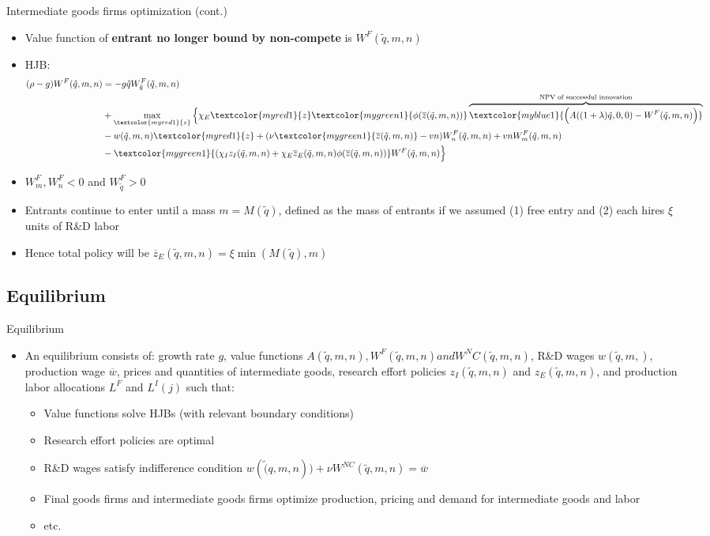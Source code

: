 \documentclass[english,usenames,dvipsnames]{beamer}
\begin{document}
\begin{frame}{Intermediate goods firms optimization (cont.)}
\begin{itemize}
	\small
	\item Value function of \textbf{entrant no longer bound by non-compete} is $W^{F}(\tilde{q},m,n)$
	\item HJB:
	\footnotesize
	\begin{align*}
	(\rho - g)W^F(\tilde{q},m,n) &= - g\tilde{q}W^F_{\tilde{q}}(\tilde{q},m,n) \\
	& + \max_{\textcolor{myred1}{z}} \Big\{\chi_E\textcolor{myred1}{z}\textcolor{mygreen1}{\phi(\overline{z}(\tilde{q},m,n))}\overbrace{\textcolor{myblue1}{\Big(A((1+\lambda)\tilde{q},0,0)-W^F(\tilde{q},m,n)\Big)}}^{\text{NPV of successful innovation}} \\
	& - w(\tilde{q},m,n)\textcolor{myred1}{z} +(\nu \textcolor{mygreen1}{\overline{z}(\tilde{q},m,n)}-vn)W^F_n(\tilde{q},m,n)+vnW^F_m(\tilde{q},m,n) \\
	& - \textcolor{mygreen1}{(\chi_Iz_I(\tilde{q},m,n)+\chi_E\overline{z}_E(\tilde{q},m,n)\phi(\overline{z}(\tilde{q},m,n))}W^F(\tilde{q},m,n)\Big\} 
	\end{align*}
	\small
	\item $W^F_m,W^F_n<0$ and $W^F_{\tilde{q}} > 0$ 
	\item Entrants continue to enter until a mass $m = M(\tilde{q})$, defined as the mass of entrants if we assumed (1) free entry and (2) each hires $\xi$ units of R\&D labor
	\item Hence total policy will be $\overline{z}_E(\tilde{q},m,n) = \xi \min (M(\tilde{q}),m)$
\end{itemize}
\end{frame}

\subsection{Equilibrium}
\begin{frame}{Equilibrium}
\small
\begin{itemize}
	\item An equilibrium consists of: growth rate $g$, value functions $A(\tilde{q},m,n),W^F(\tilde{q},m,n) and W^NC(\tilde{q},m,n)$, R\&D wages $w(\tilde{q},m,)$, production wage $\overline{w}$, prices and quantities of intermediate goods, research effort policies $z_I(\tilde{q},m,n)$ and $z_E(\tilde{q},m,n)$, and production labor allocations $L^F$ and $L^I(j)$ such that:
	\begin{itemize}
		\item Value functions solve HJBs (with relevant boundary conditions)
		\item Research effort policies are optimal
		\item R\&D wages satisfy indifference condition $w(\tilde(q,m,n)) + \nu W^{NC}(\tilde{q},m,n) = \overline{w}$
		\item Final goods firms and intermediate goods firms optimize production, pricing and demand for intermediate goods and labor
		\item etc.
	\end{itemize} 
\end{itemize}
\end{frame}
\end{document}
